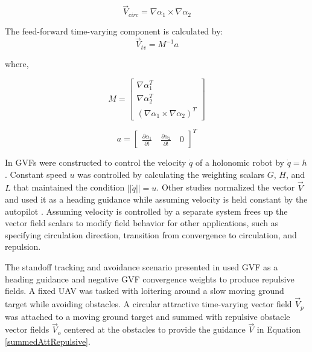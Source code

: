 \documentclass[numbered,pdftex]{ohio-etd}
\begin{document}
\begin{equation}
\overrightarrow{V}_{circ} =  \nabla\alpha_1 \times \nabla\alpha_2 
\label{circOnlySimp}
\end{equation}

\noindent
The feed-forward time-varying component is calculated by:
\begin{equation}
\label{tv}
\overrightarrow{V}_{tv} = M^{-1}a
\end{equation}

\noindent
where,

\begin{equation}
\label{mMatrix}
M =\begin{bmatrix}
\nabla\alpha_1^T \\
\nabla\alpha_2^T \\
(\nabla\alpha_1 \times \nabla\alpha_2)^T
\end{bmatrix}
\end{equation}

\begin{equation}
\label{aVector}
a =\begin{bmatrix}
\frac{\partial \alpha_1}{\partial t} \quad   \frac{\partial \alpha_2}{\partial t} \quad   0
\end{bmatrix}^T
\end{equation}


In \cite{goncalves_artificial_2009,goncalves_circulation_2010,goncalves_vector_2010} GVFs were constructed to control the velocity $\dot{q}$ of a holonomic robot by $\dot{q}=h$. Constant speed  $u$ was controlled by calculating the weighting scalars $G$, $H$, and $L$ that maintained the condition $||\dot{q}|| = u$. Other studies normalized the vector $\overrightarrow{V}$ and used it as a heading guidance while assuming velocity is held constant by the autopilot \cite{gerlach_autonomous_2014,wilhelm_2019}. Assuming velocity is controlled by a separate system frees up the vector field scalars to modify field behavior for other applications, such as specifying circulation direction, transition from convergence to circulation, and repulsion. 
 
 
 The standoff tracking and avoidance scenario presented in \cite{wilhelm_2019} used GVF as a heading guidance and negative GVF convergence weights to produce repulsive fields. A fixed UAV was tasked with loitering around a slow moving ground target while avoiding obstacles. A circular attractive time-varying vector field $\overrightarrow{V}_{p}$ was attached to a moving ground target and summed with repulsive obstacle vector fields $\overrightarrow{V}_{o}$ centered at the obstacles to provide the guidance $\overrightarrow{V}$ in Equation \ref{summedAttRepulsive}. 
 
\end{document}
